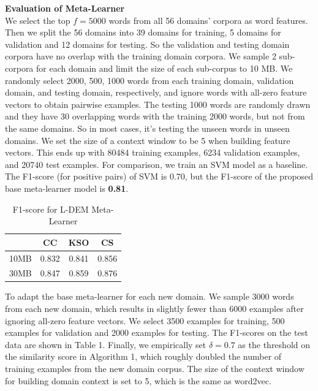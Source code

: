 \textbf{Evaluation of Meta-Learner}\\
We select the top $f=5000$ words from all 56 domains' corpora as word features.
Then we split the 56 domains into 39 domains for training, 5 domains for validation and 12 domains for testing.
So the validation and testing domain corpora have no overlap with the training domain corpora.
We sample 2 sub-corpora for each domain and limit the size of each sub-corpus to 10 MB. We randomly select 2000, 500, 1000 words from each training domain, validation domain, and testing domain, respectively, and ignore words with all-zero feature vectors to obtain pairwise examples. 
The testing 1000 words are randomly drawn and they have 30 overlapping words with the training 2000 words, but not from the same domains. So in most cases, it's testing the unseen words in unseen domains.
We set the size of a context window to be 5 when building feature vectors.
This ends up with 80484 training examples, 6234 validation examples, and 20740 test examples.
For comparison, we train an SVM model as a baseline.
The F1-score (for positive pairs) of SVM is 0.70, but the F1-score of the proposed base meta-learner model is \textbf{0.81}.

\begin{table}[t]
\begin{center}

\begin{tabular}{l || c | c | c }
\hline
 & CC & KSO & CS\\
\hline
\hline
10MB & 0.832 & 0.841 & 0.856 \\
30MB & 0.847 & 0.859 & 0.876 \\
\hline

\end{tabular}
\caption{F1-score for L-DEM Meta-Learner}
\end{center}
\label{chap3:table:fine-tune}
\end{table}

To adapt the base meta-learner for each new domain. We sample 3000 words from each new domain, which results in slightly fewer than 6000 examples after ignoring all-zero feature vectors.
We select 3500 examples for training, 500 examples for validation and 2000 examples for testing.
The F1-scores on the test data are shown in Table 1.
Finally, we empirically set $\delta=0.7$ as the threshold on the similarity score in Algorithm 1, which roughly doubled the number of training examples from the new domain corpus. 
The size of the context window for building domain context is set to 5, which is the same as word2vec.

